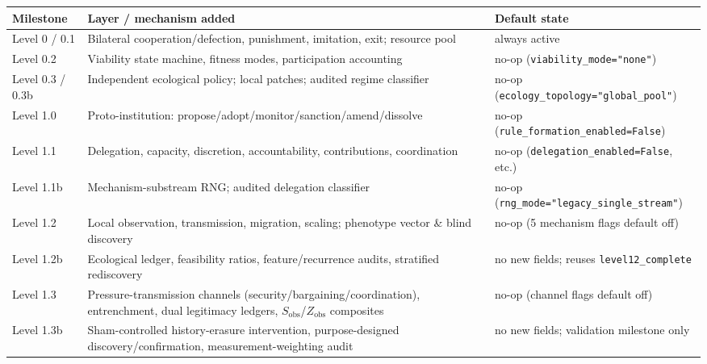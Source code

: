 \begin{tabular}{@{}lll@{}}
\toprule
\textbf{Milestone} & \textbf{Layer / mechanism added} & \textbf{Default state} \\
\midrule
Level 0 / 0.1 & Bilateral cooperation/defection, punishment, imitation, exit; resource pool & always active \\
Level 0.2     & Viability state machine, fitness modes, participation accounting & no-op (\texttt{viability\_mode="none"}) \\
Level 0.3 / 0.3b & Independent ecological policy; local patches; audited regime classifier & no-op (\texttt{ecology\_topology="global\_pool"}) \\
Level 1.0     & Proto-institution: propose/adopt/monitor/sanction/amend/dissolve & no-op (\texttt{rule\_formation\_enabled=False}) \\
Level 1.1     & Delegation, capacity, discretion, accountability, contributions, coordination & no-op (\texttt{delegation\_enabled=False}, etc.) \\
Level 1.1b    & Mechanism-substream RNG; audited delegation classifier & no-op (\texttt{rng\_mode="legacy\_single\_stream"}) \\
Level 1.2     & Local observation, transmission, migration, scaling; phenotype vector \& blind discovery & no-op (5 mechanism flags default off) \\
Level 1.2b    & Ecological ledger, feasibility ratios, feature/recurrence audits, stratified rediscovery & no new fields; reuses \texttt{level12\_complete} \\
Level 1.3     & Pressure-transmission channels (security/bargaining/coordination), entrenchment, dual legitimacy ledgers, $S_{\text{obs}}$/$Z_{\text{obs}}$ composites & no-op (channel flags default off) \\
Level 1.3b    & Sham-controlled history-erasure intervention, purpose-designed discovery/confirmation, measurement-weighting audit & no new fields; validation milestone only \\
\bottomrule
\end{tabular}
